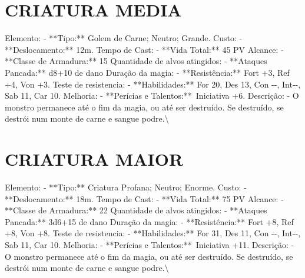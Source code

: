 \documentclass{article}%
\begin{document}
%
\section{CRIATURA MEDIA}%
\label{sec:CRIATURAMEDIA}%
Elemento: {-} **Tipo:** Golem de Carne; Neutro; Grande.\newline%
Custo: {-} **Deslocamento:** 12m.\newline%
Tempo de Cast: {-} **Vida Total:** 45 PV\newline%
Alcance: {-} **Classe de Armadura:** 15\newline%
Quantidade de alvos atingidos: {-} **Ataques Pancada:** d8+10 de dano\newline%
Duração da magia: {-} **Resistência:** Fort +3, Ref +4, Von +3.\newline%
Teste de resistencia: {-} **Habilidades:** For 20, Des 13, Con {-}{-}, Int{-}{-}, Sab 11, Car 10.\newline%
Melhoria: {-} **Perícias e Talentos:**~Iniciativa +6.\newline%
Descrição: {-} O monstro permanece até o fim da magia, ou até ser destruído. Se destruído, se destrói num monte de carne e sangue podre.\textbackslash{}

%
\section{CRIATURA MAIOR}%
\label{sec:CRIATURAMAIOR}%
Elemento: {-} **Tipo:** Criatura Profana; Neutro; Enorme.\newline%
Custo: {-} **Deslocamento:** 18m.\newline%
Tempo de Cast: {-} **Vida Total:** 75 PV\newline%
Alcance: {-} **Classe de Armadura:** 22\newline%
Quantidade de alvos atingidos: {-} **Ataques Pancada:** 3d6+15 de dano\newline%
Duração da magia: {-} **Resistência:** Fort +8, Ref +8, Von +8.\newline%
Teste de resistencia: {-} **Habilidades:** For 31, Des 11, Con {-}{-}, Int{-}{-}, Sab 11, Car 10.\newline%
Melhoria: {-} **Perícias e Talentos:**~Iniciativa +11.\newline%
Descrição: {-} O monstro permanece até o fim da magia, ou até ser destruído. Se destruído, se destrói num monte de carne e sangue podre.\textbackslash{}

%
\end{document}
